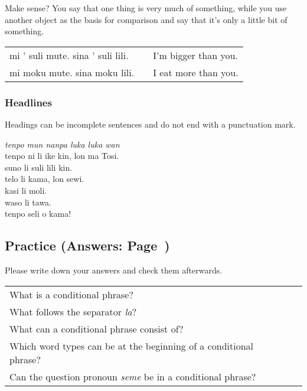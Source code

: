 Make sense? 
You say that one thing is very much of something, while you use another object as the basis for comparison and say that it's only a little bit of something. 

\begin{supertabular}{p{5,5cm}|ll}
mi ' suli mute. sina ' suli lili. && I'm bigger than you. \\
mi moku mute. sina moku lili. && I eat more than you. \\
\end{supertabular} 

%
%
\subsubsection*{Headlines} 
%
%
Headings can be incomplete sentences and do not end with a punctuation mark.

\textit{tenpo mun nanpa luka luka wan} \\
tenpo ni li ike kin, lon ma Tosi. \\
suno li suli lili kin. \\ 
telo li kama, lon sewi. \\
kasi li moli. \\
waso li tawa. \\
tenpo seli o kama! 

%
%
%
\newpage
%
\subsection*{Practice (Answers: Page~\pageref{'la'})}
%
Please write down your answers and check them afterwards. 

\begin{supertabular}{p{5,5cm}|ll}
What is a conditional phrase? &&  \\  %
What follows the separator \textit{la}? &&  \\  %
What can a conditional phrase consist of?  &&  \\  %
Which word types can be at the beginning of a conditional phrase? &&  \\  %
Can the question pronoun \textit{seme} be in a conditional phrase? &&   \\  %
\end{supertabular}

